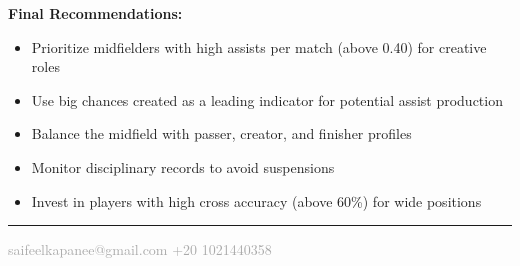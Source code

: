 \documentclass[12pt,a4paper]{article}
\begin{document}
\vspace{0.3cm}

\begin{tcolorbox}[colback=primary!10, colframe=primary, arc=5pt, boxrule=1.5pt]
\textcolor{primary}{\textbf{Final Recommendations:}}
\begin{itemize}
    \item Prioritize midfielders with high assists per match (above 0.40) for creative roles
    \item Use big chances created as a leading indicator for potential assist production
    \item Balance the midfield with passer, creator, and finisher profiles
    \item Monitor disciplinary records to avoid suspensions
    \item Invest in players with high cross accuracy (above 60\%) for wide positions
\end{itemize}
\end{tcolorbox}

\vspace{0.5cm}

\begin{center}
\textcolor{primary}{\rule{0.7\textwidth}{0.5pt}}
\end{center}

\begin{center}
\textcolor{darkgray}{\small saifeelkapanee@gmail.com \hspace{0.5cm} +20 1021440358}
\end{center}
\end{document}
